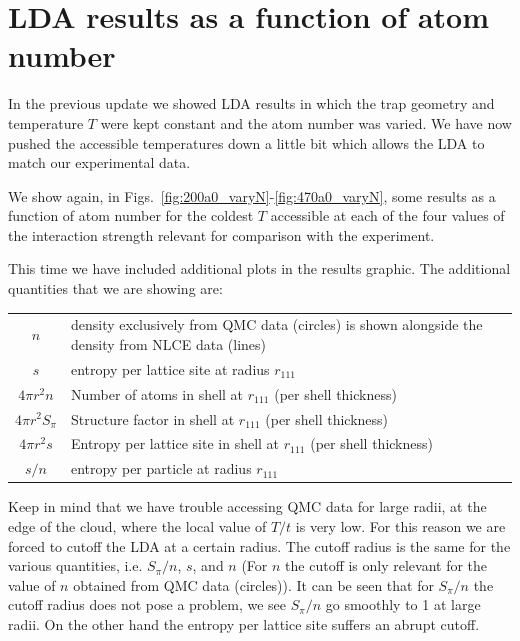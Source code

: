 \documentclass[11pt,letter]{article}
\begin{document}
\section{LDA results as a function of atom number} 

In the previous update we showed LDA results in which the trap geometry and
temperature $T$ were kept constant and the atom number was varied.  We have
now pushed the accessible temperatures down a little bit which allows the LDA
to match our experimental data.  

We show again, in Figs.~\ref{fig:200a0_varyN}-\ref{fig:470a0_varyN}, some
results as a function of atom number for the coldest $T$ accessible at each
of the four values of the interaction strength relevant for comparison with
the experiment. 

This time we have included additional plots in the results graphic.  The
additional quantities that we are showing  are:

\begin{centering}
\begin{tabular}{c|p{11cm}}
 $n$& density exclusively from QMC data (circles) is shown alongside
the density from NLCE data (lines) \\[0.6em] $s$ & entropy per lattice
site at radius $r_{111}$ \\[0.6em] $4\pi r^{2} n $ & Number of atoms in shell
at $r_{111}$ (per shell thickness) \\[0.6em] $4\pi r^{2} S_{\pi} $ &
Structure factor in shell at $r_{111}$ (per shell thickness) \\[0.6em] $4\pi
r^{2} s $ &   Entropy per lattice site in shell at $r_{111}$ (per shell
thickness) \\[0.6em] $s/n$ & entropy per particle at radius $r_{111}$
\\[0.6em]
\end{tabular} 
\end{centering}

Keep in mind that we have trouble accessing QMC data for large radii, at the
edge of the cloud,  where the local value of $T/t$ is very low.   For this
reason we are forced to cutoff the LDA at a certain radius.  The cutoff
radius is the same for the various quantities, i.e. $S_{\pi}/n$, $s$, and $n$
(For $n$ the cutoff is only relevant for the value of $n$ obtained from QMC
data (circles)).   It can be seen that for $S_{\pi}/n$ the cutoff radius does
not pose a problem,  we see $S_{\pi}/n$ go smoothly to 1 at large radii.  On
the other hand the entropy per lattice site suffers an abrupt cutoff.  
\end{document}

